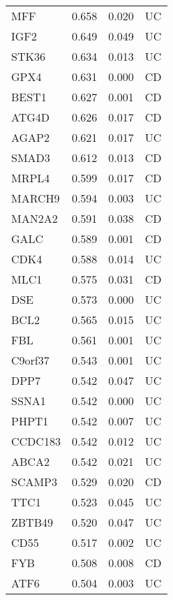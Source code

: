 \begin{center}
\begin{longtable}{| L{5cm} | R{1.2cm} | R{1cm} | L{1.5cm} |}
 MFF & 0.658 & 0.020 & UC \\ 
 IGF2 & 0.649 & 0.049 & UC \\ 
 STK36 & 0.634 & 0.013 & UC \\ 
 GPX4 & 0.631 & 0.000 & CD \\ 
 BEST1 & 0.627 & 0.001 & CD \\ 
 ATG4D & 0.626 & 0.017 & CD \\ 
 AGAP2 & 0.621 & 0.017 & UC \\ 
 SMAD3 & 0.612 & 0.013 & CD \\ 
 MRPL4 & 0.599 & 0.017 & CD \\ 
 MARCH9 & 0.594 & 0.003 & UC \\ 
 MAN2A2 & 0.591 & 0.038 & CD \\ 
 GALC & 0.589 & 0.001 & CD \\ 
 CDK4 & 0.588 & 0.014 & UC \\ 
 MLC1 & 0.575 & 0.031 & CD \\ 
 DSE & 0.573 & 0.000 & UC \\ 
 BCL2 & 0.565 & 0.015 & UC \\ 
 FBL & 0.561 & 0.001 & UC \\ 
 C9orf37 & 0.543 & 0.001 & UC \\ 
 DPP7 & 0.542 & 0.047 & UC \\ 
 SSNA1 & 0.542 & 0.000 & UC \\ 
 PHPT1 & 0.542 & 0.007 & UC \\ 
 CCDC183 & 0.542 & 0.012 & UC \\ 
 ABCA2 & 0.542 & 0.021 & UC \\ 
 SCAMP3 & 0.529 & 0.020 & CD \\ 
 TTC1 & 0.523 & 0.045 & UC \\ 
 ZBTB49 & 0.520 & 0.047 & UC \\ 
 CD55 & 0.517 & 0.002 & UC \\ 
 FYB & 0.508 & 0.008 & CD \\ 
 ATF6 & 0.504 & 0.003 & UC \\ 
   \hline
\end{longtable}
\end{center}
